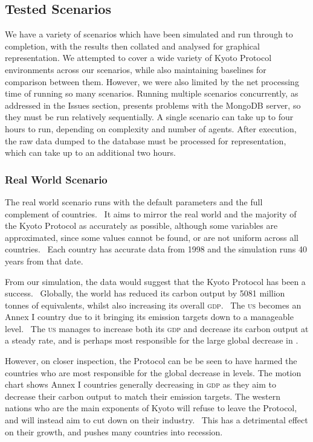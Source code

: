 \subsection{Tested Scenarios}

We have a variety of scenarios which have been simulated and run through to completion, with the results then collated and analysed for graphical representation. We attempted to cover a wide variety of Kyoto Protocol environments across our scenarios, while also maintaining baselines for comparison between them. However, we were also limited by the net processing time of running so many scenarios. Running multiple scenarios concurrently, as addressed in the Issues section, presents problems with the MongoDB server, so they must be run relatively sequentially. A single scenario can take up to four hours to run, depending on complexity and number of agents. After execution, the raw data dumped to the database must be processed for representation, which can take up to an additional two hours.

\subsubsection{Real World Scenario}

The real world scenario runs with the default parameters and the full complement of countries.  It aims to mirror the real world and the majority of the Kyoto Protocol as accurately as possible, although some variables are approximated, since some values cannot be found, or are not uniform across all countries.  Each country has accurate data from 1998 and the simulation runs 40 years from that date.

From our simulation, the data would suggest that the Kyoto Protocol has been a success.  Globally, the world has reduced its carbon output by 5081 million tonnes of \CO equivalents, whilst also increasing its overall \textsc{gdp}.  The \textsc{us} becomes an Annex I country due to it bringing its emission targets down to a manageable level.  The \textsc{us} manages to increase both its \textsc{gdp} and decrease its carbon output at a steady rate, and is perhaps most responsible for the large global decrease in \CO.

However, on closer inspection, the Protocol can be be seen to have harmed the countries who are most responsible for the global decrease in \CO levels. The motion chart shows Annex I countries generally decreasing in \textsc{gdp} as they aim to decrease their carbon output to match their emission targets. The western nations who are the main exponents of Kyoto will refuse to leave the Protocol, and will instead aim to cut down on their industry.  This has a detrimental effect on their growth, and pushes many countries into recession.

